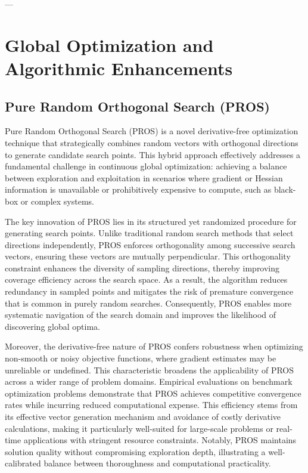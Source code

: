 \documentclass[11pt]{article}
\begin{document}
---

\cite{ref5} \cite{ref6}

\section{Global Optimization and Algorithmic Enhancements}

\subsection{Pure Random Orthogonal Search (PROS)}

Pure Random Orthogonal Search (PROS) is a novel derivative-free optimization technique that strategically combines random vectors with orthogonal directions to generate candidate search points. This hybrid approach effectively addresses a fundamental challenge in continuous global optimization: achieving a balance between exploration and exploitation in scenarios where gradient or Hessian information is unavailable or prohibitively expensive to compute, such as black-box or complex systems.

The key innovation of PROS lies in its structured yet randomized procedure for generating search points. Unlike traditional random search methods that select directions independently, PROS enforces orthogonality among successive search vectors, ensuring these vectors are mutually perpendicular. This orthogonality constraint enhances the diversity of sampling directions, thereby improving coverage efficiency across the search space. As a result, the algorithm reduces redundancy in sampled points and mitigates the risk of premature convergence that is common in purely random searches. Consequently, PROS enables more systematic navigation of the search domain and improves the likelihood of discovering global optima.

Moreover, the derivative-free nature of PROS confers robustness when optimizing non-smooth or noisy objective functions, where gradient estimates may be unreliable or undefined. This characteristic broadens the applicability of PROS across a wider range of problem domains. Empirical evaluations on benchmark optimization problems demonstrate that PROS achieves competitive convergence rates while incurring reduced computational expense. This efficiency stems from its effective vector generation mechanism and avoidance of costly derivative calculations, making it particularly well-suited for large-scale problems or real-time applications with stringent resource constraints. Notably, PROS maintains solution quality without compromising exploration depth, illustrating a well-calibrated balance between thoroughness and computational practicality.
\end{document}
